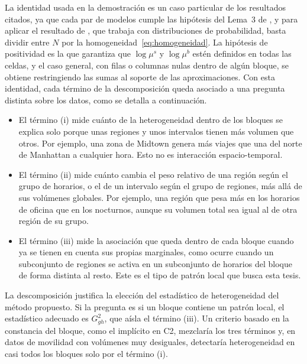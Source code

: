 La identidad usada en la demostración es un caso particular de los resultados
citados, ya que cada par de modelos cumple las hipótesis del Lema~3 de
\citet{Banerjee2007}, y para aplicar el resultado de \citet{Csiszar1975}, que trabaja
con distribuciones de probabilidad, basta dividir entre $N$ por la
homogeneidad~\eqref{eq:homogeneidad}. La hipótesis de positividad es la que
garantiza que $\log \mu^s$ y $\log \mu^b$ estén definidos en todas las celdas, y
el caso general, con filas o columnas nulas dentro de algún bloque, se obtiene
restringiendo las sumas al soporte de las aproximaciones. Con esta identidad, cada término de la
descomposición queda asociado a una pregunta distinta sobre los datos, como se
detalla a continuación.

\begin{itemize}
  \item El término (i) mide cuánto de la heterogeneidad dentro de los bloques se
        explica solo porque unas regiones y unos intervalos tienen más volumen
        que otros. Por ejemplo, una zona de Midtown genera más viajes que una del
        norte de Manhattan a cualquier hora. Esto no es interacción
        espacio-temporal.
  \item El término (ii) mide cuánto cambia el peso relativo de una región según el
        grupo de horarios, o el de un intervalo según el grupo de regiones, más
        allá de sus volúmenes globales. Por ejemplo, una región que pesa más en
        los horarios de oficina que en los nocturnos, aunque su volumen total sea
        igual al de otra región de su grupo.
  \item El término (iii) mide la asociación que queda dentro de cada bloque cuando
        ya se tienen en cuenta sus propias marginales, como ocurre cuando un
        subconjunto de regiones se activa en un subconjunto de horarios del
        bloque de forma distinta al resto. Este es el tipo de patrón local que
        busca esta tesis.
\end{itemize}

La descomposición justifica la elección del estadístico de heterogeneidad del
método propuesto. Si la pregunta es si un bloque contiene un patrón local, el
estadístico adecuado es $G^2_{gh}$, que aísla el término (iii). Un criterio basado
en la constancia del bloque, como el implícito en C2, mezclaría los tres términos
y, en datos de movilidad con volúmenes muy desiguales, detectaría heterogeneidad
en casi todos los bloques solo por el término (i).

